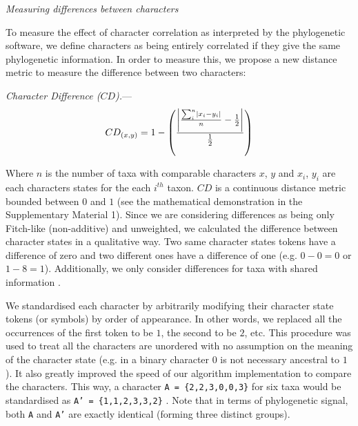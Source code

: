 \documentclass[12pt,letterpaper]{article}
\DeclarePairedDelimiter\abs{\lvert}{\rvert}%
\renewcommand{\subsection}[1]{%
\bigskip
\begin{center}
\begin{large}
\normalfont\itshape #1
\end{large}
\end{center}}
\renewcommand{\subsubsection}[1]{%
\vspace{2ex}
\noindent
\textit{#1.}---}
\begin{document}
\subsection{Measuring differences between characters}
\label{CD_description}
To measure the effect of character correlation as interpreted by the phylogenetic software, we define characters as being entirely correlated if they give the same phylogenetic information.
In order to measure this, we propose a new distance metric to measure the difference between two characters:

\subsubsection{Character Difference ($CD$)}
\begin{equation}
    CD_{(x,y)} = 1 - \left(\frac{\abs*{\frac{\sum_{i}^{n}\abs{x_{i} - y_{i}}}{n}-\frac{1}{2}}}{\frac{1}{2}}\right)
\end{equation}

\noindent Where $n$ is the number of taxa with comparable characters $x$, $y$ and $x_i$, $y_i$ are each characters states for the each $i^{th}$ taxon.
$CD$ is a continuous distance metric bounded between $0$ and $1$ (see the mathematical demonstration in the Supplementary Material 1).
Since we are considering differences as being only Fitch-like (non-additive) and unweighted, we calculated the difference between character states in a qualitative way.
Two same character states tokens have a difference of zero and two different ones have a difference of one (e.g. $0 - 0 = 0$ or $1 - 8 = 1$).
Additionally, we only consider differences for taxa with shared information \citep[i.e. a Gower distance;][]{GowerDist}.

We standardised each character by arbitrarily modifying their character state tokens (or symbols) by order of appearance.
In other words, we replaced all the occurrences of the first token to be $1$, the second to be $2$, etc.
This procedure was used to treat all the characters are unordered with no assumption on the meaning of the character state (e.g. in a binary character $0$ is not necessary ancestral to $1$).
It also greatly improved the speed of our algorithm implementation to compare the characters.
This way, a character \texttt{A = \{2,2,3,0,0,3\}} for six taxa would be standardised as \texttt{A' = \{1,1,2,3,3,2\}} \citep[following the \textit{xyz} notation in][p.13]{felsenstein2004inferring}.
Note that in terms of phylogenetic signal, both \texttt{A} and \texttt{A'} are exactly identical (forming three distinct groups).
\end{document}
